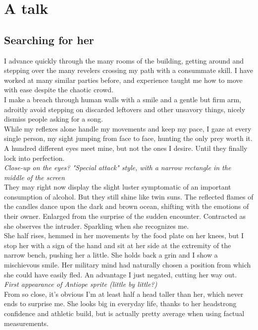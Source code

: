 \documentclass{report}
\newcommand{\dcomment}[1]{
	\emph{#1}
	\\
}
\newcommand{\gsection}[1]{
	\section*{#1}
	\label{#1}
}
\begin{document}
\chapter{A talk}

\gsection{Searching for her}

I advance quickly through the many rooms of the building, getting around and stepping over the many revelers crossing my path with a consummate skill. I have worked at many similar parties before, and experience taught me how to move with ease despite the chaotic crowd.\\

I make a breach through human walls with a smile and a gentle but firm arm, adroitly avoid stepping on discarded leftovers and other unsavory things, nicely dismiss people asking for a song.\\

While my reflexes alone handle my movements and keep my pace, I gaze at every single person, my sight jumping from face to face, hunting the only prey worth it. A hundred different eyes meet mine, but not the ones I desire. Until they finally lock into perfection.\\

\dcomment{
	Close-up on the eyes? "Special attack" style, with a narrow rectangle in the middle of the screen
}

They may right now display the slight luster symptomatic of an important consumption of alcohol. But they still shine like twin suns. The reflected flames of the candles dance upon the dark and brown ocean, shifting with the emotions of their owner. Enlarged from the surprise of the sudden encounter. Contracted as she observes the intruder. Sparkling when she recognizes me.\\

She half rises, hemmed in her movements by the food plate on her knees, but I stop her with a sign of the hand and sit at her side at the extremity of the narrow bench, pushing her a little. She holds back a grin and I show a mischievous smile. Her military mind had naturally chosen a position from which she could have easily fled. An advantage I just negated, cutting her way out.\\

\dcomment{
	First appearance of Antiope sprite (little by little?)
}

From so close, it's obvious I'm at least half a head taller than her, which never ends to surprise me. She looks big in everyday life, thanks to her headstrong confidence and athletic build, but is actually pretty average when using factual measurements.\\
\end{document}
